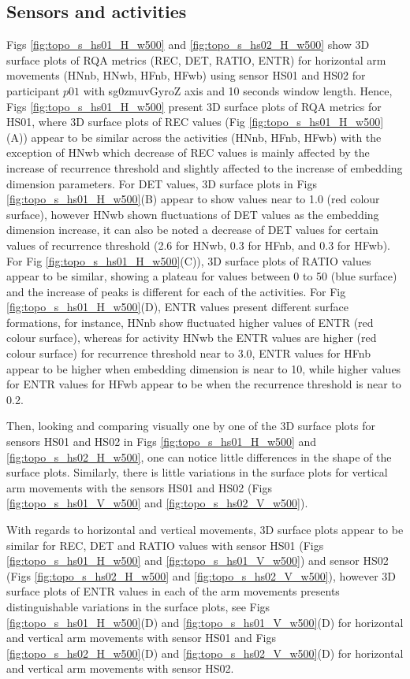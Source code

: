 \subsection{Sensors and activities}
Figs \ref{fig:topo_s_hs01_H_w500} and \ref{fig:topo_s_hs02_H_w500} show
3D surface plots of RQA metrics (REC, DET, RATIO, ENTR) for horizontal arm 
movements (HNnb, HNwb, HFnb, HFwb) using sensor HS01 and HS02 
for participant $p01$ with sg0zmuvGyroZ axis and 10 seconds window length.
Hence, Figs \ref{fig:topo_s_hs01_H_w500} present 3D surface plots of RQA metrics 
for HS01, where 3D surface plots of REC values 
(Fig \ref{fig:topo_s_hs01_H_w500}(A)) appear to be similar across 
the activities (HNnb, HFnb, HFwb) with the exception of HNwb which 
decrease of REC values is mainly affected by the increase of recurrence 
threshold and slightly affected to the increase of embedding dimension 
parameters. For DET values, 3D surface plots in Figs \ref{fig:topo_s_hs01_H_w500}(B)
appear to show values near to 1.0 (red colour surface), however HNwb 
shown fluctuations of DET values as the embedding dimension increase, 
it can also be noted a decrease of DET values for certain values of 
recurrence threshold (2.6 for HNwb, 0.3 for HFnb, and 0.3 for HFwb).
For Fig \ref{fig:topo_s_hs01_H_w500}(C)), 3D surface plots of RATIO values 
appear to be similar, showing a plateau for values between 0 to 50 
(blue surface) and the increase of peaks is different for each of the 
activities.
For Fig \ref{fig:topo_s_hs01_H_w500}(D), ENTR values present different 
surface formations, for instance, 
HNnb show fluctuated higher values of ENTR (red colour surface),
whereas for activity HNwb the ENTR values are higher (red colour surface) 
for recurrence threshold near to 3.0,
ENTR values for HFnb appear to be higher when embedding dimension is near 
to 10, while higher values for ENTR values for HFwb appear to be 
when the recurrence threshold is near to 0.2.

Then, looking and comparing visually one by one of the 3D surface plots 
for sensors HS01 and HS02 in Figs \ref{fig:topo_s_hs01_H_w500} 
and \ref{fig:topo_s_hs02_H_w500}, one can notice little differences in the 
shape of the surface plots.
Similarly, there is little variations in the surface plots for vertical arm 
movements with the sensors HS01 and HS02 
(Figs \ref{fig:topo_s_hs01_V_w500} and \ref{fig:topo_s_hs02_V_w500}).

With regards to horizontal and vertical movements, 
3D surface plots appear to be similar for REC, DET and RATIO values
with sensor HS01
(Figs \ref{fig:topo_s_hs01_H_w500} and \ref{fig:topo_s_hs01_V_w500})
and sensor HS02
(Figs \ref{fig:topo_s_hs02_H_w500} and \ref{fig:topo_s_hs02_V_w500}), 
however 3D surface plots of ENTR values in each of the arm movements
presents distinguishable variations in the surface plots,
see Figs \ref{fig:topo_s_hs01_H_w500}(D) and \ref{fig:topo_s_hs01_V_w500}(D) 
for horizontal and vertical arm movements with sensor HS01 and
Figs \ref{fig:topo_s_hs02_H_w500}(D) and \ref{fig:topo_s_hs02_V_w500}(D) 
for horizontal and vertical arm movements with sensor HS02.

